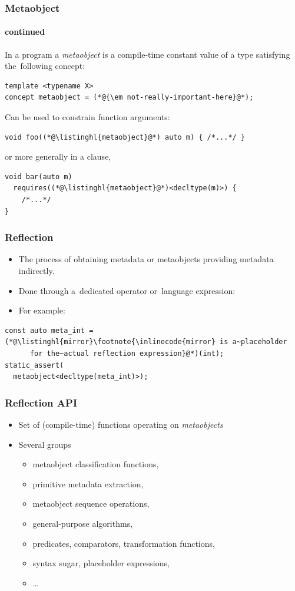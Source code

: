 \documentclass[compress,table,xcolor=table]{beamer}
\begin{document}
\begin{frame}[fragile]
  \frametitle{Metaobject}
  \framesubtitle{continued}
  \larger
  In a program a {\em metaobject} is a compile-time constant
    {\larger value} of a type satisfying the~following concept:
  \begin{lstlisting}[language=c++2x]
template <typename X>
concept metaobject = (*@{\em not-really-important-here}@*);
  \end{lstlisting}
  \vfill
  Can be used to constrain function arguments:
  \begin{lstlisting}[language=c++2x]
void foo((*@\listinghl{metaobject}@*) auto m) { /*...*/ }
  \end{lstlisting}
  or more generally in a  clause,
  \begin{lstlisting}[language=c++2x]
void bar(auto m)
  requires((*@\listinghl{metaobject}@*)<decltype(m)>) {
    /*...*/
}
  \end{lstlisting}
\end{frame}
\begin{frame}[fragile]
  \frametitle{Reflection}
  \larger
  \begin{itemize}
    \item The process of obtaining metadata or metaobjects providing metadata
      indirectly.
    \item Done through a~dedicated operator or~language expression:
    \item For example:
  \end{itemize}
  \begin{lstlisting}[language=c++2x]
const auto meta_int = (*@\listinghl{mirror}\footnote{\inlinecode{mirror} is a~placeholder
      for the~actual reflection expression}@*)(int);
static_assert(
  metaobject<decltype(meta_int)>);
  \end{lstlisting}
\end{frame}
\begin{frame}
  \frametitle{Reflection API}
  \larger
  \begin{itemize}
    \item Set of (compile-time) functions operating on {\em metaobjects}
    \item Several groups
    \begin{itemize}
      \item metaobject classification functions,
      \item primitive metadata extraction,
      \item metaobject sequence operations,
      \item general-purpose algorithms,
      \item predicates, comparators, transformation functions,
      \item syntax sugar, placeholder expressions,
      \item \ldots
    \end{itemize}
  \end{itemize}
\end{frame}
\end{document}
